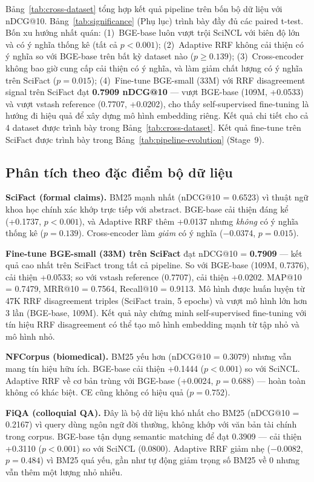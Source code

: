Bảng~\ref{tab:cross-dataset} tổng hợp kết quả pipeline trên bốn bộ dữ liệu với nDCG@10.
Bảng~\ref{tab:significance} (Phụ lục) trình bày đầy đủ các paired t-test. Bốn xu hướng
nhất quán: (1)~BGE-base luôn vượt trội SciNCL với biên độ lớn và có ý nghĩa thống kê (tất cả
$p<0.001$); (2)~Adaptive RRF không cải thiện có ý nghĩa so với BGE-base trên bất kỳ dataset nào
($p\ge0.139$); (3)~Cross-encoder không bao giờ cung cấp cải thiện có ý nghĩa, và làm giảm chất
lượng có ý nghĩa trên SciFact ($p=0.015$); (4)~Fine-tune BGE-small (33M) với RRF disagreement
signal trên SciFact đạt \textbf{0.7909 nDCG@10} --- vượt BGE-base (109M, +0.0533) và vượt vstash
reference (0.7707, +0.0202), cho thấy self-supervised fine-tuning là hướng đi hiệu quả để xây dựng
mô hình embedding riêng. Kết quả chi tiết cho cả 4 dataset được trình bày trong
Bảng~\ref{tab:cross-dataset}. Kết quả fine-tune trên SciFact được trình bày trong
Bảng~\ref{tab:pipeline-evolution} (Stage~9).

\subsection{Phân tích theo đặc điểm bộ dữ liệu}
\label{sec:validation:analysis}

\textbf{SciFact (formal claims).} BM25 mạnh nhất (nDCG@10 = 0.6523) vì thuật ngữ khoa học chính xác
khớp trực tiếp với abstract. BGE-base cải thiện đáng kể (+0.1737, $p<0.001$), và Adaptive RRF thêm
+0.0137 nhưng \emph{không} có ý nghĩa thống kê ($p=0.139$). Cross-encoder làm \emph{giảm} có ý
nghĩa ($-$0.0374, $p=0.015$).

\textbf{Fine-tune BGE-small (33M) trên SciFact} đạt nDCG@10 = \textbf{0.7909} --- kết quả cao nhất
trên SciFact trong tất cả pipeline. So với BGE-base (109M, 0.7376), cải thiện +0.0533; so với
vstash reference (0.7707), cải thiện +0.0202. MAP@10 = 0.7479, MRR@10 = 0.7564, Recall@10 = 0.9113.
Mô hình được huấn luyện từ 47K RRF disagreement triples (SciFact train, 5 epochs) và vượt mô hình
lớn hơn 3 lần (BGE-base, 109M). Kết quả này chứng minh self-supervised fine-tuning với tín hiệu
RRF disagreement có thể tạo mô hình embedding mạnh từ tập nhỏ và mô hình nhỏ.

\textbf{NFCorpus (biomedical).} BM25 yếu hơn (nDCG@10 = 0.3079) nhưng vẫn mang tín hiệu hữu ích.
BGE-base cải thiện +0.1444 ($p<0.001$) so với SciNCL. Adaptive RRF về cơ bản trùng với BGE-base
(+0.0024, $p=0.688$) --- hoàn toàn không có khác biệt. CE cũng không có hiệu quả ($p=0.752$).

\textbf{FiQA (colloquial QA).} Đây là bộ dữ liệu khó nhất cho BM25 (nDCG@10 = 0.2167) vì query dùng
ngôn ngữ đời thường, không khớp với văn bản tài chính trong corpus. BGE-base tận dụng semantic
matching để đạt 0.3909 --- cải thiện +0.3110 ($p<0.001$) so với SciNCL (0.0800). Adaptive RRF
giảm nhẹ ($-$0.0082, $p=0.484$) vì BM25 quá yếu, gần như tự động giảm trọng số BM25 về 0 nhưng
vẫn thêm một lượng nhỏ nhiễu.

